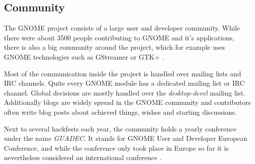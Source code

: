 
\subsection{Community} %

The GNOME project consists of a large user and developer community. While there
were about 3500 people contributing to GNOME and it's applications, there is
also a big community around the project, which for example uses GNOME
technologies such as GStreamer or GTK+ \cite{GNOMEAbout,GNOMETeams}.

Most of the communication inside the project is handled over mailing lists and
\ac{IRC} channels. Quite every GNOME module has a dedicated mailing list or
\ac{IRC} channel. Global decisions are mostly handled over the
\emph{desktop-devel} mailing list. Additionally blogs are widely spread in the
GNOME community and contributors often write blog posts about achieved things,
wishes and starting discussions.

Next to several hackfests each year, the community holds a yearly conference
under the name \emph{GUADEC}. It stands for GNOME User and Developer European
Conference, and while the conference only took place in Europe so far it is
nevertheless considered an international conference \cite{GNOMEGUADEC}.

